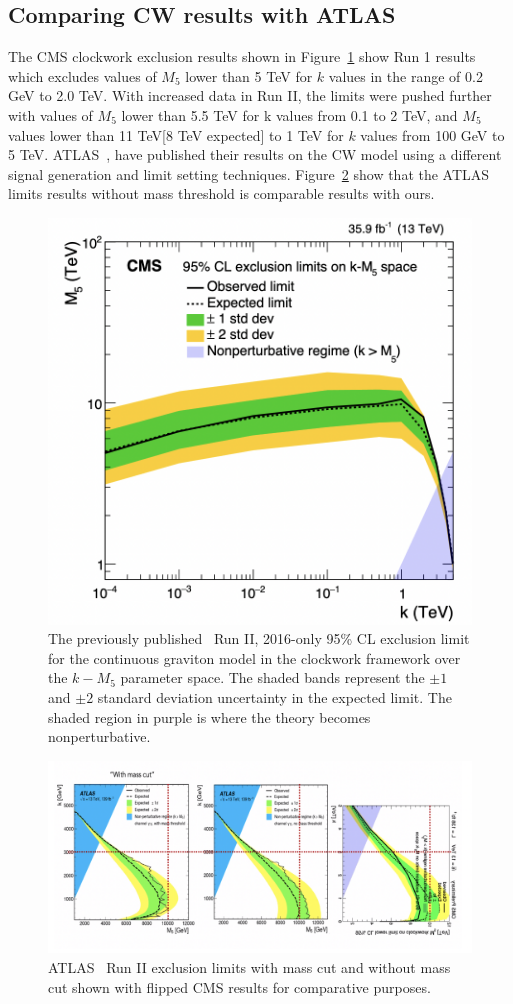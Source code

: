 
\subsection{\label{sec:ATLAS_results} Comparing CW results with ATLAS}

The CMS clockwork exclusion results shown in Figure~\ref{Fig:LIMIT_Clockwork_RUN1} show Run 1 results which excludes values of $M_5$ lower than 5 TeV for $k$ values in the range of 0.2 GeV to 2.0 TeV. With increased data in Run II, the limits were pushed further with values of $M_5$ lower than 5.5 TeV for k values from 0.1 to 2 TeV, and $M_5$ values lower than 11 TeV[8 TeV expected] to 1 TeV for $k$ values from 100 GeV to 5 TeV.  ATLAS~\cite{ATLAS:2023hbp}, have published their results on the CW model using a different signal generation and limit setting techniques. Figure~\ref{Fig:LIMIT_Clockwork_ATLAS} show that the ATLAS limits results without mass threshold is comparable results with ours.


\begin{figure}[h!]\centering
\includegraphics[width=0.47\linewidth]{fig/CWCMSI.png}
\caption{The previously published~\cite{cmsdiphoton2016} Run II, 2016-only 95\% CL exclusion limit for the continuous graviton model in the clockwork framework over the $k-M_5$ parameter space. The shaded bands represent the $\pm1$ and $\pm2$ standard deviation uncertainty in the expected limit. The shaded region in purple is where the theory becomes nonperturbative.}
\label{Fig:LIMIT_Clockwork_RUN1}
\end{figure}

\begin{figure}[h!]\centering
\includegraphics[width=0.9\linewidth]{fig/ATLASComp.png}
\caption{ATLAS~\cite{ATLAS:2023hbp} Run II exclusion limits with mass cut and without mass cut shown with flipped CMS results for comparative purposes.}
\label{Fig:LIMIT_Clockwork_ATLAS}
\end{figure}


